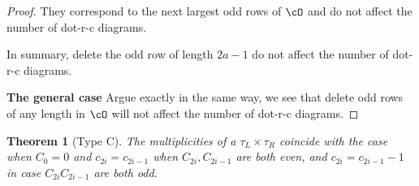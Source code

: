 \documentclass[12pt,a4paper]{amsart}
\numberwithin{equation}{section}
\newtheorem{thm}{Theorem}[section]
\theoremstyle{remark}
\begin{document}
\begin{proof}

They correspond to the next largest odd rows of $\cO$ and do
not affect the number of dot-r-c diagrams.

In summary, delete the odd row of length $2a-1$
do not affect the number of dot-r-c diagrams.

\textbf{The general case} Argue exactly in the same way, we see that delete odd rows of any length in $\cO$ will
not affect the number of dot-r-c diagrams.


\end{proof}

\begin{thm}[{Type C}]\label{t:1}
The multiplicities of a $\tau_L\times\tau_R$ coincide with the case
when $C_0=0$ and $c_{2i}=c_{2i-1}$ when $C_{2i},C_{2i-1}$ are both even, and
{\color{red} $c_{2i}=c_{2i-1}-1$} in case $C_{2i}C_{2i-1}$ are both odd. 
\end{thm}
\end{document}
